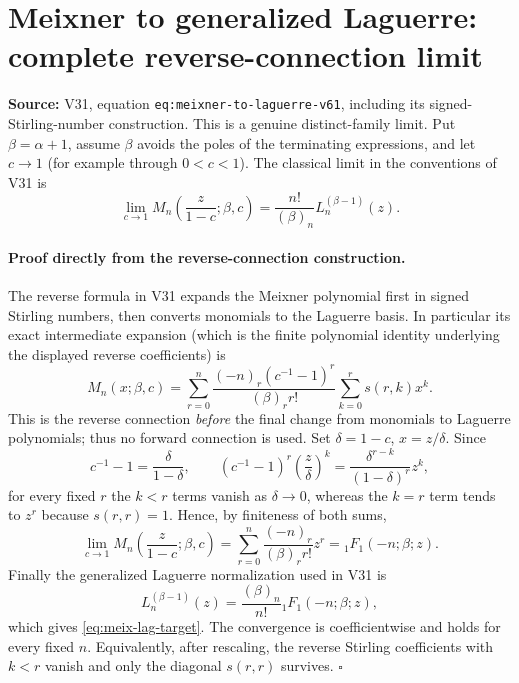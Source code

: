 \documentclass[11pt]{article}
\begin{document}
\section{Meixner to generalized Laguerre: complete reverse-connection limit}
\noindent\textbf{Source:} V31, equation \texttt{eq:meixner-to-laguerre-v61}, including its signed-Stirling-number construction. This is a genuine distinct-family limit. Put $\beta=\alpha+1$, assume $\beta$ avoids the poles of the terminating expressions, and let $c\to1$ (for example through $0<c<1$). The classical limit in the conventions of V31 is
\begin{equation}\label{eq:meix-lag-target}
\lim_{c\to1}M_n\!\left(\frac{z}{1-c};\beta,c\right)
=\frac{n!}{(\beta)_n}L_n^{(\beta-1)}(z).
\end{equation}
\paragraph{Proof directly from the reverse-connection construction.}
The reverse formula in V31 expands the Meixner polynomial first in signed Stirling numbers, then converts monomials to the Laguerre basis. In particular its exact intermediate expansion (which is the finite polynomial identity underlying the displayed reverse coefficients) is
\begin{equation}\label{eq:stirling-start}
M_n(x;\beta,c)=\sum_{r=0}^n
\frac{(-n)_r(c^{-1}-1)^r}{(\beta)_r r!}
\sum_{k=0}^r s(r,k)x^k.
\end{equation}
This is the reverse connection \emph{before} the final change from monomials to Laguerre polynomials; thus no forward connection is used. Set $\delta=1-c$, $x=z/\delta$. Since
\[
c^{-1}-1=\frac{\delta}{1-\delta},\qquad
\left(c^{-1}-1\right)^r\left(\frac z\delta\right)^k
=\frac{\delta^{r-k}}{(1-\delta)^r}z^k,
\]
for every fixed $r$ the $k<r$ terms vanish as $\delta\to0$, whereas the $k=r$ term tends to $z^r$ because $s(r,r)=1$. Hence, by finiteness of both sums,
\begin{equation}\label{eq:meix-limit-monomial}
\lim_{c\to1}M_n\!\left(\frac z{1-c};\beta,c\right)
=\sum_{r=0}^n\frac{(-n)_r}{(\beta)_r r!}z^r
={}_1F_1(-n;\beta;z).
\end{equation}
Finally the generalized Laguerre normalization used in V31 is
\[
L_n^{(\beta-1)}(z)=\frac{(\beta)_n}{n!}{}_1F_1(-n;\beta;z),
\]
which gives \eqref{eq:meix-lag-target}. The convergence is coefficientwise and holds for every fixed $n$. Equivalently, after rescaling, the reverse Stirling coefficients with $k<r$ vanish and only the diagonal $s(r,r)$ survives. \hfill$\square$
\end{document}
